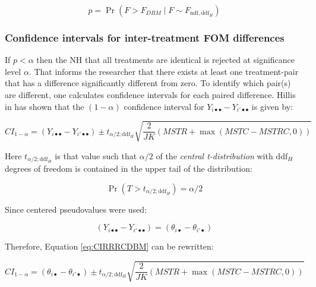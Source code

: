 \documentclass[
]{book}
\begin{document}
\begin{equation}
p=\Pr\left ( F > F_{DBM} \mid F \sim F_{\text{ndf},\text{ddf}_H} \right )
\label{eq:pValueRRRC}
\end{equation}

\hypertarget{confidence-intervals-for-inter-treatment-fom-differences}{%
\subsubsection{Confidence intervals for inter-treatment FOM differences}\label{confidence-intervals-for-inter-treatment-fom-differences}}

If \(p < \alpha\) then the NH that all treatments are identical is rejected at significance level \(\alpha\). That informs the researcher that there exists at least one treatment-pair that has a difference significantly different from zero. To identify which pair(s) are different, one calculates confidence intervals for each paired difference. Hillis in \citep{RN1772} has shown that the \((1-\alpha)\) confidence interval for \(Y_{i \bullet \bullet} - Y_{i' \bullet \bullet}\) is given by:

\begin{equation}
CI_{1-\alpha}=\left ( Y_{i \bullet \bullet} - Y_{i' \bullet \bullet} \right ) \pm t_{\alpha/2;\text{ddf}_H} \sqrt{\frac{2}{JK}\left ( MSTR + \max\left ( MSTC-MSTRC,0 \right ) \right )}
\label{eq:CIRRRCDBM}
\end{equation}

Here \(t_{\alpha/2;\text{ddf}_H}\) is that value such that \(\alpha/2\) of the \emph{central t-distribution} with \(\text{ddf}_H\) degrees of freedom is contained in the upper tail of the distribution:

\begin{equation}
\Pr\left ( T>t_{\alpha/2;\text{ddf}_H} \right )=\alpha/2
\label{eq:tDistTailProb}
\end{equation}

Since centered pseudovalues were used:

\begin{equation}
\left ( Y_{i \bullet \bullet} - Y_{i' \bullet \bullet} \right )=\left ( \theta_{i \bullet } - \theta_{i' \bullet} \right )
\end{equation}

Therefore, Equation \eqref{eq:CIRRRCDBM} can be rewritten:

\begin{equation}
CI_{1-\alpha}=\left ( \theta_{i \bullet} - \theta_{i' \bullet} \right ) \pm t_{\alpha/2;\text{ddf}_H} \sqrt{\frac{2}{JK}\left ( MSTR + \max\left ( MSTC-MSTRC,0 \right ) \right )}
\label{eq:confIntervalRRRC}
\end{equation}
\end{document}
